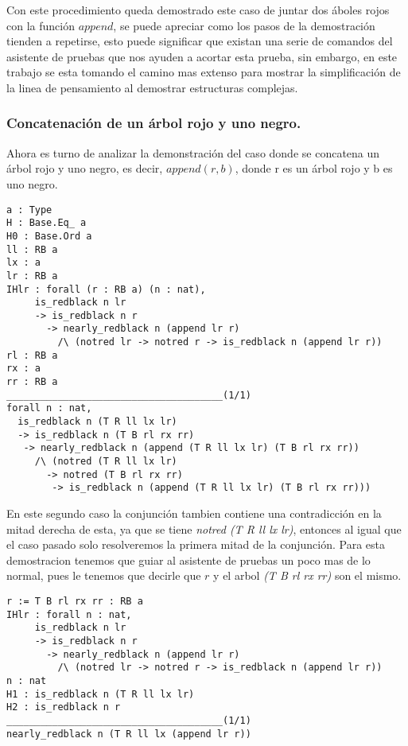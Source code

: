 Con este procedimiento queda demostrado este caso de juntar dos \'aboles rojos con la funci\'on
$append$, se puede apreciar como los pasos de la demostraci\'on tienden a repetirse, esto puede
significar que existan una serie de comandos del asistente de pruebas que nos ayuden a acortar
esta prueba, sin embargo, en este trabajo se esta tomando el camino mas extenso para mostrar la
simplificaci\'on de la linea de pensamiento al demostrar estructuras complejas.

\subsubsection{Concatenaci\'on de un \'arbol rojo y uno negro.}

Ahora es turno de analizar la demonstraci\'on del caso donde se concatena un \'arbol rojo y uno negro, es decir, $append(r,b)$, donde r es un \'arbol rojo y b es uno negro.

\begin{verbatim}
a : Type
H : Base.Eq_ a
H0 : Base.Ord a
ll : RB a
lx : a
lr : RB a
IHlr : forall (r : RB a) (n : nat),
     is_redblack n lr
     -> is_redblack n r
       -> nearly_redblack n (append lr r)
         /\ (notred lr -> notred r -> is_redblack n (append lr r))
rl : RB a
rx : a
rr : RB a
______________________________________(1/1)
forall n : nat,
  is_redblack n (T R ll lx lr)
  -> is_redblack n (T B rl rx rr)
   -> nearly_redblack n (append (T R ll lx lr) (T B rl rx rr))
     /\ (notred (T R ll lx lr)
       -> notred (T B rl rx rr)
        -> is_redblack n (append (T R ll lx lr) (T B rl rx rr)))
\end{verbatim}

En este segundo caso la conjunci\'on tambien contiene una contradicci\'on en la mitad derecha de
esta, ya que se tiene \textit{notred (T R ll lx lr)}, entonces al igual que el caso pasado solo
resolveremos la primera mitad de la conjunci\'on. Para esta demostracion tenemos que guiar al asistente de pruebas un poco mas de lo normal, pues le tenemos que decirle que $r$ y el arbol \textit{(T B rl rx rr)} son el mismo.

\begin{verbatim}
r := T B rl rx rr : RB a
IHlr : forall n : nat,
     is_redblack n lr
     -> is_redblack n r
       -> nearly_redblack n (append lr r)
         /\ (notred lr -> notred r -> is_redblack n (append lr r))
n : nat
H1 : is_redblack n (T R ll lx lr)
H2 : is_redblack n r
______________________________________(1/1)
nearly_redblack n (T R ll lx (append lr r))
\end{verbatim}

